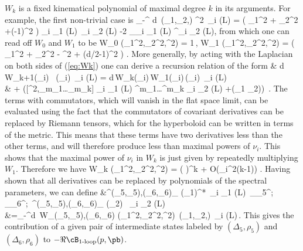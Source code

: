 		\label{eq:Wk}
	\eeq
$W_{k}$ is a fixed kinematical  polynomial of maximal degree $k$ in its arguments.
For example, the first non-trivial case is
	\beq
		\int\limits_{-\infty}^\infty \!\! d\nu \, \Phi(\nu_1,\nu_2,\nu) \nu^2 \,\Omega_{i \nu} (L)
		= \left( \nu_1^2 + \nu_2^2 +(-1)^2 \right) \Omega_{i \nu_1} (L)\, \Omega_{i \nu_2} (L)
		-2 \nabla_\mu \Omega_{i \nu_1} (L) \nabla^\mu \Omega_{i \nu_2} (L),
	\eeq
from which one can read off $W_{0}$ and $W_1$ to be 
	\beq
		W_{0} \big(\nu_1^2,\nu_2^2,\nu^2\big) = 1\,, \qquad
		W_{1} \big(\nu_1^2,\nu_2^2,\nu^2\big)  =  \Big(
		\nu_1^2 + \nu_2^2 - \nu^2 + (d/2-1)^2
		\Big) .
	\eeq
More generally, by acting with the Laplacian on both sides of (\ref{eq:Wk}) one can derive a recursion relation of the form
	\bea
{}&		\int d\nu \,W_{k+1}(\nu_i) \, \Phi(\nu_i)\, \Omega_{i \nu} (L) = \int d\nu \,W_{k}(\nu_i)\,W_{1}(\nu_i)\,\Phi(\nu_i) \,\Omega_{i \nu} (L) \\
		& +  \left([\nabla^2,\nabla_{m_1}\dots\nabla_{m_{k}}] \Omega_{i \nu_1} (L) \nabla^{m_1}\dots\nabla^{m_{k}} \Omega_{i \nu_2} (L) +(\nu_1 \leftrightarrow \nu_2)\right) \,.
The terms with commutators, which will vanish in the flat space limit, can be evaluated using the fact that the commutators of covariant derivatives can be replaced by Riemann tensors, which for the hyperboloid can be written in terms of the metric. This means that these terms have two derivatives less than the other terms, and will therefore produce less than maximal powers of $\nu_i$. This shows that the maximal power of $\nu_i$ in $W_k$ is just given by repeatedly multiplying $W_1$. Therefore we have
	\beq
		W_{k} \big(\nu_1^2,\nu_2^2,\nu^2\big)  = \left( 
		 \right)^k + O\!\left(\nu_i^{2(k-1)}\right) .
\label{eq:Wk_leading}
	\eeq
Having shown that all derivatives can be replaced by polynomials of the spectral parameters, we can define
	\bea
		&^{(\De_5,\rho_5),(\De_6,\rho_6)}_{ } (\nu_1)^*\, \Omega_{i \nu_1} (L)
		\,\pi_{\rho_5}^{;}
		\pi_{\rho_6}^{;}\,
		^{(\De_5,\rho_5),(\De_6,\rho_6)}_{ } (\nu_2)
		\, \Omega_{i \nu_2} (L)\\
		&=\int\limits_{-\infty}^\infty d\nu \, W_{(\De_5,\rho_5),(\De_6,\rho_6)} \big(\nu_1^2,\nu_2^2,\nu^2\big)\, \Phi(\nu_1,\nu_2,\nu) \,\Omega_{i \nu} (L)\,.
This gives the contribution of a given pair of intermediate states labeled by $(\Delta_5,\rho_5)$ and $(\Delta_6,\rho_6)$ to $- \Re \cB_{\text{1-loop}}(p,\pb)$.
